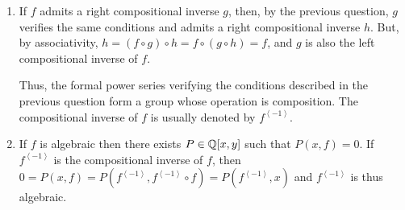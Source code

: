 \begin{solution}
\begin{enumerate}
            Conversely, if $f(0)=0$ and $\frac{\mathrm{d}
            f}{\mathrm{d} x}(0) \neq 0$, then we can define $g$ such
            that $f \circ g = x$ inductively as follows.
            For the composition to be well defined we must have $g(0)=0$.
            Moreover, by identifying the coefficients of $f \circ g$
            and $x$, we have $g_1 = \frac{1}{f_1}$, and $\coef{x^n}{f
            \circ g} = 0$ for all $n \geq 2$.
            Thus, by \eqref{eq:coef}, $g_n = \frac{-1}{f_1} \sum_{k =
            2}^{n} f_k \sum_{i_1 + \dots + i_k = n} g_{i_1} \dots
            g_{i_k}$ is defined as a function of the values of the
            previous $g_i$.
        \item If $f$ admits a right compositional inverse $g$, then,
            by the previous question, $g$ verifies the same
            conditions and admits a right compositional inverse $h$.
            But, by associativity, $h = (f \circ g) \circ h = f \circ
            (g \circ h) = f$, and $g$ is also the left compositional
            inverse of $f$.

            Thus, the formal power series verifying the conditions
            described in the previous question form a group whose
            operation is composition.
            The compositional inverse of $f$ is usually denoted by
            $f^{\left<-1\right>}$.
        \item If $f$ is algebraic then there exists $P \in
            \mathbb Q[x,y]$ such that $P(x,f)=0$.
            If $f^{\left<-1\right>}$ is the compositional inverse of
            $f$, then $0 = P(x,f) = P(f^{\left<-1\right>},
            f^{\left<-1\right>} \circ f) = P(f^{\left<-1\right>},x)$
            and $f^{\left<-1\right>}$ is thus algebraic.
    \end{enumerate}
\end{solution}


